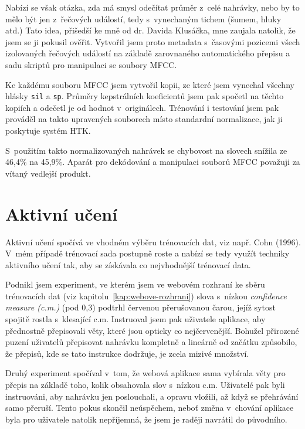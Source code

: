 Nabízí se však otázka, zda má smysl odečítat průměr z~celé nahrávky, nebo by to
mělo být jen z~řečových událostí, tedy s~vynechaným tichem (šumem, hluky atd.)
Tato idea, přišedší ke mně od dr. Davida Klusáčka, mne zaujala natolik, že jsem se
ji pokusil ověřit. Vytvořil jsem proto metadata s~časovými pozicemi všech
izolovaných řečových událostí na základě zarovnaného automatického přepisu a sadu skriptů
pro manipulaci se soubory MFCC.

Ke každému souboru MFCC jsem vytvořil kopii, ze které
jsem vynechal všechny hlásky \texttt{sil} a \texttt{sp}. Průměry kepstrálních
koeficientů jsem pak spočetl na těchto kopiích a odečetl je od hodnot
v~originálech. Trénování i testování jsem pak prováděl na takto upravených
souborech místo standardní normalizace, jak ji poskytuje systém HTK.

S~použitím takto normalizovaných nahrávek se chybovost na slovech snížila ze
46,4\% na 45,9\%.  Aparát pro dekódování
a manipulaci souborů MFCC považuji za vítaný vedlejší produkt.

\section{Aktivní učení}

Aktivní učení spočívá ve vhodném výběru trénovacích dat, viz např. Cohn
(1996)\cite{cohn1996active}. V~mém případě trénovací sada postupně roste a nabízí
se tedy využít techniky aktivního učení tak, aby se získávala co nejvhodnější
trénovací data.

Podnikl jsem experiment, ve kterém jsem ve webovém rozhraní ke sběru trénovacích
dat (viz kapitolu~\ref{kap:webove-rozhrani}) slova s~nízkou {\em confidence
measure (c.m.)} (pod 0,3) podtrhl červenou přerušovanou čarou, jejíž sytost spojitě rostla
s~klesající c.m. Instruoval jsem pak uživatele aplikace, aby přednostně
přepisovali věty, které jsou opticky co nejčervenější. Bohužel přirozené puzení
uživatelů přepisovat nahrávku kompletně a lineárně od začátku způsobilo, že
přepisů, kde se tato instrukce dodržuje, je zcela mizivé množství.

Druhý experiment spočíval v~tom, že webová aplikace sama vybírala věty pro
přepis na základě toho, kolik obsahovala slov s~nízkou c.m. Uživatelé pak byli
instruováni, aby nahrávku jen poslouchali, a opravu vložili, až když se
přehrávání samo přeruší. Tento pokus skončil neúspěchem, neboť
změna v~chování aplikace byla pro uživatele natolik nepříjemná, že jsem je
raději navrátil do původního.

